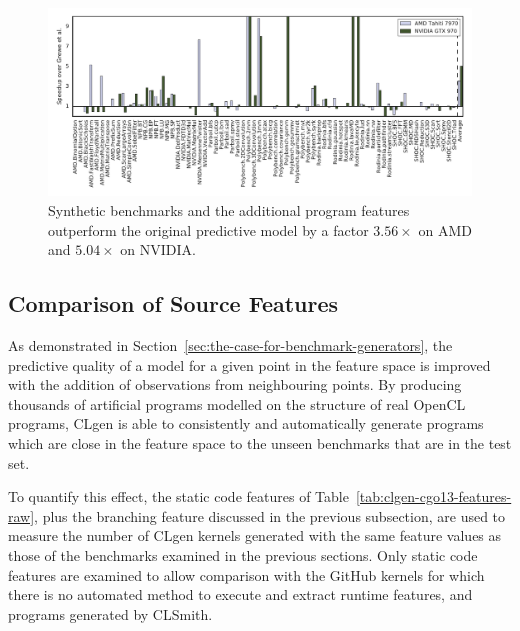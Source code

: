 \begin{figure}
  \centering%
  \includegraphics[width=1.45\textwidth,angle=270]{img/ex2}%
  \caption[Speedups of predictions using extended model over state-of-the-art]{%
     Synthetic benchmarks and the additional program features outperform the original predictive model by a factor $3.56\times$ on AMD and $5.04\times$ on NVIDIA.%
  }%
  \label{fig:ex2}%
\end{figure}


\subsection{Comparison of Source Features}

As demonstrated in Section~\ref{sec:the-case-for-benchmark-generators}, the predictive quality of a model for a given point in the feature space is improved with the addition of observations from neighbouring points. By producing thousands of artificial programs modelled on the structure of real OpenCL programs, CLgen is able to consistently and automatically generate programs which are close in the feature space to the unseen benchmarks that are in the test set.

To quantify this effect, the static code features of Table~\ref{tab:clgen-cgo13-features-raw}, plus the branching feature discussed in the previous subsection, are used to measure the number of CLgen kernels generated with the same feature values as those of the benchmarks examined in the previous sections. Only static code features are examined to allow comparison with the GitHub kernels for which there is no automated method to execute and extract runtime features, and programs generated by CLSmith.

